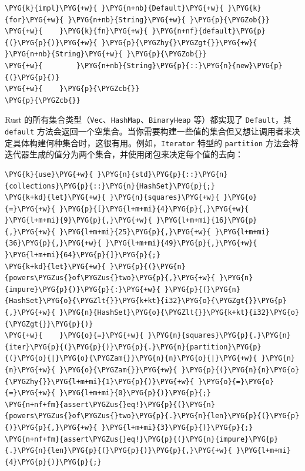\begin{Verbatim}[commandchars=\\\{\},breaklines=true,breakanywhere=true,fontsize=\codefont,xleftmargin=17bp]
\PYG{k}{impl}\PYG{+w}{ }\PYG{n+nb}{Default}\PYG{+w}{ }\PYG{k}{for}\PYG{+w}{ }\PYG{n+nb}{String}\PYG{+w}{ }\PYG{p}{\PYGZob{}}
\PYG{+w}{    }\PYG{k}{fn}\PYG{+w}{ }\PYG{n+nf}{default}\PYG{p}{(}\PYG{p}{)}\PYG{+w}{ }\PYG{p}{\PYGZhy{}\PYGZgt{}}\PYG{+w}{ }\PYG{n+nb}{String}\PYG{+w}{ }\PYG{p}{\PYGZob{}}
\PYG{+w}{        }\PYG{n+nb}{String}\PYG{p}{::}\PYG{n}{new}\PYG{p}{(}\PYG{p}{)}
\PYG{+w}{    }\PYG{p}{\PYGZcb{}}
\PYG{p}{\PYGZcb{}}
\end{Verbatim}

Rust 的所有集合类型（\texttt{Vec}、\texttt{HashMap}、\texttt{BinaryHeap} 等）都实现了 \texttt{Default}，其 \texttt{default} 方法会返回一个空集合。当你需要构建一些值的集合但又想让调用者来决定具体构建何种集合时，这很有用。例如，\texttt{Iterator} 特型的 \texttt{partition} 方法会将迭代器生成的值分为两个集合，并使用闭包来决定每个值的去向：

\begin{Verbatim}[commandchars=\\\{\},breaklines=true,breakanywhere=true,fontsize=\codefont,xleftmargin=17bp]
\PYG{k}{use}\PYG{+w}{ }\PYG{n}{std}\PYG{p}{::}\PYG{n}{collections}\PYG{p}{::}\PYG{n}{HashSet}\PYG{p}{;}
\PYG{k+kd}{let}\PYG{+w}{ }\PYG{n}{squares}\PYG{+w}{ }\PYG{o}{=}\PYG{+w}{ }\PYG{p}{[}\PYG{l+m+mi}{4}\PYG{p}{,}\PYG{+w}{ }\PYG{l+m+mi}{9}\PYG{p}{,}\PYG{+w}{ }\PYG{l+m+mi}{16}\PYG{p}{,}\PYG{+w}{ }\PYG{l+m+mi}{25}\PYG{p}{,}\PYG{+w}{ }\PYG{l+m+mi}{36}\PYG{p}{,}\PYG{+w}{ }\PYG{l+m+mi}{49}\PYG{p}{,}\PYG{+w}{ }\PYG{l+m+mi}{64}\PYG{p}{]}\PYG{p}{;}
\PYG{k+kd}{let}\PYG{+w}{ }\PYG{p}{(}\PYG{n}{powers\PYGZus{}of\PYGZus{}two}\PYG{p}{,}\PYG{+w}{ }\PYG{n}{impure}\PYG{p}{)}\PYG{p}{:}\PYG{+w}{ }\PYG{p}{(}\PYG{n}{HashSet}\PYG{o}{\PYGZlt{}}\PYG{k+kt}{i32}\PYG{o}{\PYGZgt{}}\PYG{p}{,}\PYG{+w}{ }\PYG{n}{HashSet}\PYG{o}{\PYGZlt{}}\PYG{k+kt}{i32}\PYG{o}{\PYGZgt{}}\PYG{p}{)}
\PYG{+w}{    }\PYG{o}{=}\PYG{+w}{ }\PYG{n}{squares}\PYG{p}{.}\PYG{n}{iter}\PYG{p}{(}\PYG{p}{)}\PYG{p}{.}\PYG{n}{partition}\PYG{p}{(}\PYG{o}{|}\PYG{o}{\PYGZam{}}\PYG{n}{n}\PYG{o}{|}\PYG{+w}{ }\PYG{n}{n}\PYG{+w}{ }\PYG{o}{\PYGZam{}}\PYG{+w}{ }\PYG{p}{(}\PYG{n}{n}\PYG{o}{\PYGZhy{}}\PYG{l+m+mi}{1}\PYG{p}{)}\PYG{+w}{ }\PYG{o}{=}\PYG{o}{=}\PYG{+w}{ }\PYG{l+m+mi}{0}\PYG{p}{)}\PYG{p}{;}
\PYG{n+nf+fm}{assert\PYGZus{}eq!}\PYG{p}{(}\PYG{n}{powers\PYGZus{}of\PYGZus{}two}\PYG{p}{.}\PYG{n}{len}\PYG{p}{(}\PYG{p}{)}\PYG{p}{,}\PYG{+w}{ }\PYG{l+m+mi}{3}\PYG{p}{)}\PYG{p}{;}
\PYG{n+nf+fm}{assert\PYGZus{}eq!}\PYG{p}{(}\PYG{n}{impure}\PYG{p}{.}\PYG{n}{len}\PYG{p}{(}\PYG{p}{)}\PYG{p}{,}\PYG{+w}{ }\PYG{l+m+mi}{4}\PYG{p}{)}\PYG{p}{;}
\end{Verbatim}


